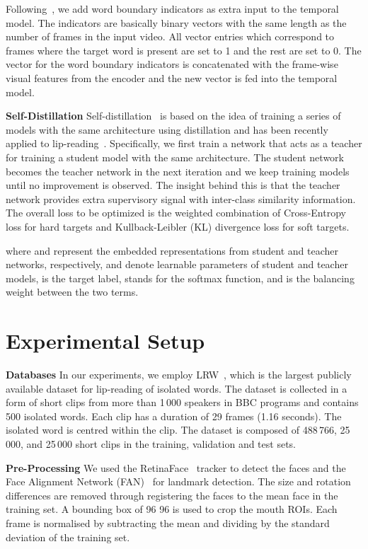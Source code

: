 \documentclass{article}
\begin{document}
Following~\cite{DBLP:journals/corr/abs-2011-07557, stafylakis18}, we add word boundary indicators as extra input to the temporal model. The indicators are basically  binary vectors with the same length as the number of frames in the input video. All vector entries which correspond to frames where the target word is present are set to 1 and the rest are set to 0. The vector for the word boundary indicators is concatenated with the frame-wise visual features from the encoder and the new vector is fed into the temporal model.

\noindent\textbf{Self-Distillation}\quad
Self-distillation~\cite{furlanello2018born} is based on the idea of training a series of models with the same architecture using distillation and has been recently applied to lip-reading~\cite{ma2020towards}. Specifically, we first train a network that acts as a teacher for training a student model with the same architecture.
The student network becomes the teacher network in the next iteration and we keep training models until no improvement is observed. The insight behind this is that the teacher network provides extra supervisory signal with inter-class similarity information.
The overall loss  to be optimized is the weighted combination of Cross-Entropy loss  for hard targets and Kullback-Leibler (KL) divergence loss  for soft targets.

where  and  represent the embedded representations from student and teacher networks, respectively,  and  denote learnable parameters of student and teacher models,   is the target label,  stands for the softmax function, and  is the balancing weight between the two terms.


\section{Experimental Setup}

\noindent\textbf{Databases}\quad
In our experiments, we employ LRW~\cite{chung16}, which is the largest publicly available dataset for lip-reading of isolated words. The dataset is collected in a form of short clips from more than 1\,000 speakers in BBC programs and contains 500 isolated words.
Each clip has a duration of 29 frames (1.16 seconds). The isolated word is centred within the clip. The dataset is composed of 488\,766, 25\,000, and 25\,000 short clips in the training, validation and test sets.

\noindent\textbf{Pre-Processing}\quad
We used the RetinaFace~\cite{DBLP:journals/corr/abs-1905-00641} tracker to detect the faces and the Face Alignment Network (FAN)~\cite{bulat2017far} for landmark detection. The size and rotation differences are removed through registering the faces to the mean face in the training set. A bounding box of 96  96 is used to crop the mouth ROIs. Each frame is normalised by subtracting the mean and dividing by the standard deviation of the training set.
\end{document}
